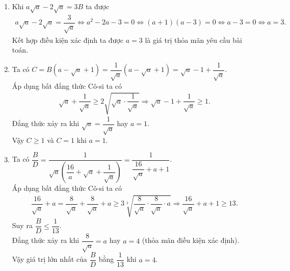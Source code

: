 \begin{bt}
{\begin{enumerate}
			\item Khi $a\sqrt{a}-2\sqrt{a}=3B$ ta được
			\allowdisplaybreaks
			\begin{eqnarray*}
				a\sqrt{a}-2\sqrt{a}=\dfrac{3}{\sqrt{a}} \Leftrightarrow a^2-2a-3=0 \Leftrightarrow (a+1)(a-3) = 0 \Leftrightarrow a-3=0 \Leftrightarrow a = 3.
			\end{eqnarray*}
			Kết hợp điều kiện xác định ta được $a=3$ là giá trị thỏa mãn yêu cầu bài toán.
			\item Ta có $C=B\left(a-\sqrt{a}+1\right) = \dfrac{1}{\sqrt{a}}\left(a-\sqrt{a}+1\right) = \sqrt{a}-1+\dfrac{1}{\sqrt{a}}$.\\
			Áp dụng bất đẳng thức Cô-si ta có
			\begin{eqnarray*}
				\sqrt{a}+\dfrac{1}{\sqrt{a}} \geq 2\sqrt{\sqrt{a} \cdot \dfrac{1}{\sqrt{a}}} \Rightarrow \sqrt{a}-1+\dfrac{1}{\sqrt{a}} \geq 1.
			\end{eqnarray*}
			Đẳng thức xảy ra khi $\sqrt{a}=\dfrac{1}{\sqrt{a}}$ hay $a=1$.\\
			Vậy $C \geq 1$ và $C=1$ khi $a=1$.
			\item Ta có $\dfrac{B}{D} = \dfrac{1}{\sqrt{a}\left(\dfrac{16}{a}+\sqrt{a}+\dfrac{1}{\sqrt{a}}\right)} = \dfrac{1}{\dfrac{16}{\sqrt{a}}+a+1}$.\\
			Áp dụng bất đẳng thức Cô-si ta có
			\begin{eqnarray*}
				\dfrac{16}{\sqrt{a}}+a = \dfrac{8}{\sqrt{a}}+\dfrac{8}{\sqrt{a}}+a \geq 3\sqrt[3]{\dfrac{8}{\sqrt{a}} \cdot \dfrac{8}{\sqrt{a}} \cdot a} \Rightarrow \dfrac{16}{\sqrt{a}}+a+1 \geq 13.
			\end{eqnarray*}
			Suy ra $\dfrac{B}{D} \leq \dfrac{1}{13}$.\\
			Đẳng thức xảy ra khi $\dfrac{8}{\sqrt{a}} = a$ hay $a=4$ (thỏa mãn điều kiện xác định).\\
			Vậy giá trị lớn nhất của $\dfrac{B}{D}$ bằng $\dfrac{1}{13}$ khi $a=4$.
		\end{enumerate}
	}
\end{bt}

